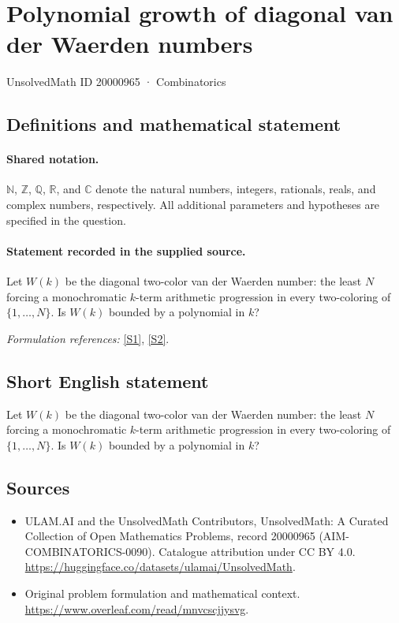 \documentclass[11pt]{article}
\newcommand{\sref}[2]{\hyperlink{source:#1:#2}{[S#2]}}
\begin{document}
\setcounter{section}{20000964}
\section{Polynomial growth of diagonal van der Waerden numbers}\label{20000965}
{\small UnsolvedMath ID 20000965 · Combinatorics}
\subsection{Definitions and mathematical statement}

\paragraph{Shared notation.}$\mathbb N$, $\mathbb Z$, $\mathbb Q$, $\mathbb R$, and $\mathbb C$ denote the natural numbers, integers, rationals, reals, and complex numbers, respectively. All additional parameters and hypotheses are specified in the question.


\paragraph{Statement recorded in the supplied source.}
Let $W(k)$ be the diagonal two-color van der Waerden number: the least $N$ forcing a monochromatic $k$-term arithmetic progression in every two-coloring of $\{1,\ldots,N\}$. Is $W(k)$ bounded by a polynomial in $k$?
\par\smallskip\textit{Formulation references:} \sref{20000965}{1}, \sref{20000965}{2}.
\subsection{Short English statement}
Let $W(k)$ be the diagonal two-color van der Waerden number: the least $N$ forcing a monochromatic $k$-term arithmetic progression in every two-coloring of $\{1,\ldots,N\}$. Is $W(k)$ bounded by a polynomial in $k$?
\subsection{Sources}
\begin{itemize}
\item[\hypertarget{source:20000965:1}{S1}] ULAM.AI and the UnsolvedMath Contributors, UnsolvedMath: A Curated Collection of Open Mathematics Problems, record 20000965 (AIM-COMBINATORICS-0090). Catalogue attribution under CC BY 4.0.
\url{https://huggingface.co/datasets/ulamai/UnsolvedMath}.
\item[\hypertarget{source:20000965:2}{S2}] Original problem formulation and mathematical context.
\url{https://www.overleaf.com/read/mnvcscjjysvg}.
\end{itemize}
\label{end:20000965}
\end{document}
